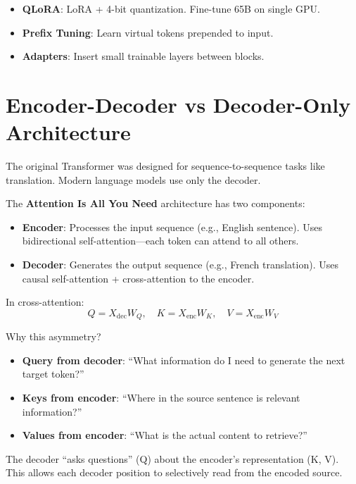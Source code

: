 \begin{remark}
    \begin{itemize}
        \item \textbf{QLoRA}: LoRA + 4-bit quantization. Fine-tune 65B on single GPU.
        \item \textbf{Prefix Tuning}: Learn virtual tokens prepended to input.
        \item \textbf{Adapters}: Insert small trainable layers between blocks.
    \end{itemize}
\end{remark}

\section{Encoder-Decoder vs Decoder-Only Architecture}

The original Transformer was designed for sequence-to-sequence tasks like translation. Modern language models use only the decoder.

\begin{definition}
    The \textbf{Attention Is All You Need} architecture has two components:
    \begin{itemize}
        \item \textbf{Encoder}: Processes the input sequence (e.g., English sentence). Uses bidirectional self-attention---each token can attend to all others.
        \item \textbf{Decoder}: Generates the output sequence (e.g., French translation). Uses causal self-attention + cross-attention to the encoder.
    \end{itemize}
\end{definition}

\begin{remark}
    In cross-attention:
    \[
        Q = X_{\text{dec}} W_Q, \quad K = X_{\text{enc}} W_K, \quad V = X_{\text{enc}} W_V
    \]

    Why this asymmetry?
    \begin{itemize}
        \item \textbf{Query from decoder}: ``What information do I need to generate the next target token?''
        \item \textbf{Keys from encoder}: ``Where in the source sentence is relevant information?''
        \item \textbf{Values from encoder}: ``What is the actual content to retrieve?''
    \end{itemize}

    The decoder ``asks questions'' (Q) about the encoder's representation (K, V). This allows each decoder position to selectively read from the encoded source.
\end{remark}

